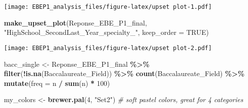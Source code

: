 \documentclass[
]{article}
\newenvironment{Shaded}{\begin{snugshade}}{\end{snugshade}}
\newcommand{\AttributeTok}[1]{\textcolor[rgb]{0.13,0.29,0.53}{#1}}
\newcommand{\CommentTok}[1]{\textcolor[rgb]{0.56,0.35,0.01}{\textit{#1}}}
\newcommand{\ConstantTok}[1]{\textcolor[rgb]{0.56,0.35,0.01}{#1}}
\newcommand{\DecValTok}[1]{\textcolor[rgb]{0.00,0.00,0.81}{#1}}
\newcommand{\FunctionTok}[1]{\textcolor[rgb]{0.13,0.29,0.53}{\textbf{#1}}}
\newcommand{\NormalTok}[1]{#1}
\newcommand{\OtherTok}[1]{\textcolor[rgb]{0.56,0.35,0.01}{#1}}
\newcommand{\SpecialCharTok}[1]{\textcolor[rgb]{0.81,0.36,0.00}{\textbf{#1}}}
\newcommand{\StringTok}[1]{\textcolor[rgb]{0.31,0.60,0.02}{#1}}
\begin{document}
\texttt{[image: EBEP1\_analysis\_files/figure-latex/upset plot-1.pdf]}

\begin{Shaded}
\begin{Highlighting}[]
\FunctionTok{make\_upset\_plot}\NormalTok{(Reponse\_EBE\_P1\_final, }\StringTok{"HighSchool\_SecondLast\_Year\_specialty\_"}\NormalTok{, }\AttributeTok{keep\_order =} \ConstantTok{TRUE}\NormalTok{)}
\end{Highlighting}
\end{Shaded}

\texttt{[image: EBEP1\_analysis\_files/figure-latex/upset plot-2.pdf]}

\begin{Shaded}
\begin{Highlighting}[]
\NormalTok{bacc\_single }\OtherTok{\textless{}{-}}\NormalTok{ Reponse\_EBE\_P1\_final }\SpecialCharTok{\%\textgreater{}\%}
  \FunctionTok{filter}\NormalTok{(}\SpecialCharTok{!}\FunctionTok{is.na}\NormalTok{(Baccalaureate\_Field)) }\SpecialCharTok{\%\textgreater{}\%}
  \FunctionTok{count}\NormalTok{(Baccalaureate\_Field) }\SpecialCharTok{\%\textgreater{}\%}
  \FunctionTok{mutate}\NormalTok{(}\AttributeTok{freq =}\NormalTok{ n }\SpecialCharTok{/} \FunctionTok{sum}\NormalTok{(n) }\SpecialCharTok{*} \DecValTok{100}\NormalTok{)}

\NormalTok{my\_colors }\OtherTok{\textless{}{-}} \FunctionTok{brewer.pal}\NormalTok{(}\DecValTok{4}\NormalTok{, }\StringTok{"Set2"}\NormalTok{)  }\CommentTok{\# soft pastel colors, great for 4 categories}
\end{Highlighting}
\end{Shaded}
\end{document}
